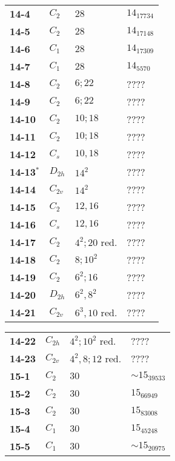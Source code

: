 \documentclass[12pt]{article}
\begin{document}
\begin{table}
\begin{center}
{\begin{minipage}{7cm}
\begin{tabular}{||l|l|l|l||}
{\bf 14-4}      &$C_2$  &$28$           &$14_{17734}$\\
{\bf 14-5}      &$C_2$  &$28$           &$14_{17148}$\\
{\bf 14-6}      &$C_1$  &$28$           &$14_{17309}$\\
{\bf 14-7}      &$C_1$  &$28$           &$14_{5570}$\\
{\bf 14-8}      &$C_{2}$        &$6; 22$                &????\\
{\bf 14-9}      &$C_2$  &$6; 22$                &????\\
{\bf 14-10}     &$C_2$  &$10; 18$               &????\\
{\bf 14-11}     &$C_2$  &$10; 18$               &????\\
{\bf 14-12}     &$C_s$  &$10, 18$               &????\\
{\bf 14-13${}^{*}$}     &$D_{2h}$       &$14^2$         &????\\
{\bf 14-14}     &$C_{2v}$       &$14^2$         &????\\
{\bf 14-15}     &$C_2$  &$12, 16$               &????\\
{\bf 14-16}     &$C_{s}$        &$12, 16$               &????\\
{\bf 14-17}     &$C_2$  &$4^2; 20$ red. &????\\
{\bf 14-18}     &$C_2$  &$8; 10^2$      &????\\
{\bf 14-19}     &$C_2$  &$6^2; 16$      &????\\
{\bf 14-20}     &$D_{2h}$       &$6^2, 8^2$     &????\\
{\bf 14-21}     &$C_{2v}$       &$6^3, 10$ red. &????\\
\hline\hline
\end{tabular}
\end{minipage}
\begin{minipage}[t]{7cm}
\begin{tabular}{||l|l|l|l||}
\hline\hline
{\bf 14-22}     &$C_{2h}$       &$4^2; 10^2$ red.       &????\\
{\bf 14-23}     &$C_{2v}$       &$4^2, 8; 12$ red.      &????\\\hline
{\bf 15-1}      &$C_2$  &$30$   &$\sim 15_{39533}$\\
{\bf 15-2}      &$C_2$  &$30$   &$15_{66949}$\\
{\bf 15-3}      &$C_2$  &$30$   &$15_{83008}$\\
{\bf 15-4}      &$C_1$  &$30$   &$15_{45248}$\\
{\bf 15-5}      &$C_1$  &$30$   &$\sim 15_{20975}$\\

\end{tabular}
\end{minipage}}
\end{center}
\end{table}
\end{document}
